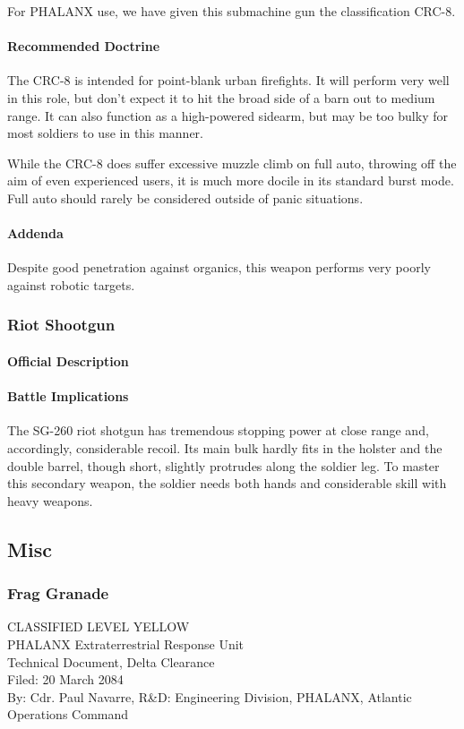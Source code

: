For PHALANX use, we have given this submachine gun the classification CRC-8.
\paragraph*{Recommended Doctrine}
The CRC-8 is intended for point-blank urban firefights. It will perform very well in this role, but don't expect it to hit the broad side of a barn out to medium range. It can also function as a high-powered sidearm, but may be too bulky for most soldiers to use in this manner.

While the CRC-8 does suffer excessive muzzle climb on full auto, throwing off the aim of even experienced users, it is much more docile in its standard burst mode. Full auto should rarely be considered outside of panic situations.
\paragraph*{Addenda}
Despite good penetration against organics, this weapon performs very poorly against robotic targets.
\subsubsection*{Riot Shootgun}
\paragraph*{Official Description}
\paragraph*{Battle Implications}
The SG-260 riot shotgun has tremendous stopping power at close range and, accordingly, considerable recoil. Its main bulk hardly fits in the holster and the double barrel, though short, slightly protrudes along the soldier leg. To master this secondary weapon, the soldier needs both hands and considerable skill with heavy weapons.
\subsection{Misc}
\subsubsection*{Frag Granade}
CLASSIFIED LEVEL YELLOW\\
PHALANX Extraterrestrial Response Unit\\
Technical Document, Delta Clearance\\
Filed: 20 March 2084\\
By: Cdr. Paul Navarre, R&D: Engineering Division, PHALANX, Atlantic Operations Command\\
